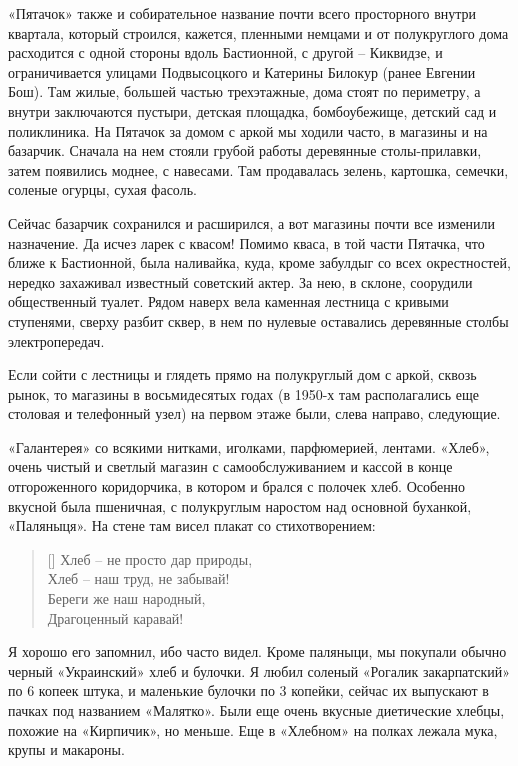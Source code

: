 «Пятачок» также и собирательное название почти всего просторного внутри квартала, который строился, кажется, пленными немцами и от полукруглого дома расходится с одной стороны вдоль Бастионной, с другой – Киквидзе, и ограничивается улицами Подвысоцкого и Катерины Билокур (ранее Евгении Бош). Там жилые, большей частью трехэтажные, дома стоят по периметру, а внутри заключаются пустыри, детская площадка, бомбоубежище, детский сад и поликлиника. На Пятачок за домом с аркой мы ходили часто, в магазины и на базарчик. Сначала на нем стояли грубой работы деревянные столы-прилавки, затем появились моднее, с навесами. Там продавалась зелень, картошка, семечки, соленые огурцы, сухая фасоль.

Сейчас базарчик сохранился и расширился, а вот магазины почти все изменили назначение. Да исчез ларек с квасом! Помимо кваса, в той части Пятачка, что ближе к Бастионной, была наливайка, куда, кроме забулдыг со всех окрестностей, нередко захаживал известный советский актер. За нею, в склоне, соорудили общественный туалет. Рядом наверх вела каменная лестница с кривыми ступенями, сверху разбит сквер, в нем по нулевые оставались деревянные столбы электропередач.

Если сойти с лестницы и глядеть прямо на полукруглый дом с аркой, сквозь рынок, то магазины в восьмидесятых годах (в 1950-х там располагались еще столовая и телефонный узел) на первом этаже были, слева направо, следующие.

«Галантерея» со всякими нитками, иголками, парфюмерией, лентами. «Хлеб», очень чистый и светлый магазин с самообслуживанием и кассой в конце отгороженного коридорчика, в котором и брался с полочек хлеб. Особенно вкусной была пшеничная, с полукруглым наростом над основной буханкой, «Паляныця». На стене там висел плакат со стихотворением:

\settowidth{\versewidth}{Хлеб – не просто дар природы,}
\begin{verse}[\versewidth]
Хлеб – не просто дар природы,\\
Хлеб – наш труд, не забывай!\\
Береги же наш народный,\\
Драгоценный каравай!
\end{verse}

Я хорошо его запомнил, ибо часто видел. Кроме паляныци, мы покупали обычно черный «Украинский» хлеб и булочки. Я любил соленый «Рогалик закарпатский» по 6 копеек штука, и маленькие булочки по 3 копейки, сейчас их выпускают в пачках под названием «Малятко». Были еще очень вкусные диетические хлебцы, похожие на «Кирпичик», но меньше. Еще в «Хлебном» на полках лежала мука, крупы и макароны.

